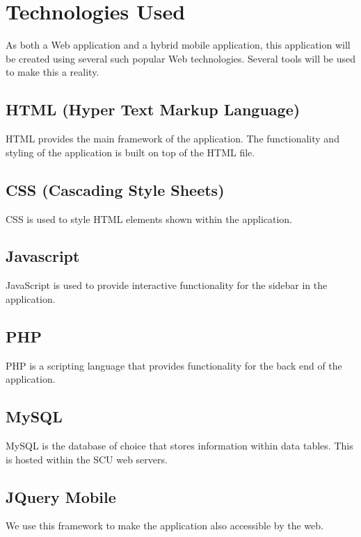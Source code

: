 \chapter{Technologies Used}
As both a Web application and a hybrid mobile application, this application will be created using several such popular Web technologies. Several tools will be used to make this a reality.

\section{HTML (Hyper Text Markup Language)}
HTML provides the main framework of the application. The functionality and styling of the application is built on top of the HTML file.

\section{CSS (Cascading Style Sheets)}
CSS is used to style HTML elements shown within the application.

\section{Javascript}
JavaScript is used to provide interactive functionality for the sidebar in the application.

\section{PHP}
PHP is a scripting language that provides functionality for the back end of the application.

\section{MySQL}
MySQL is the database of choice that stores information within data tables. This is hosted within the SCU web servers.

\section{JQuery Mobile}
We use this framework to make the application also accessible by the web.